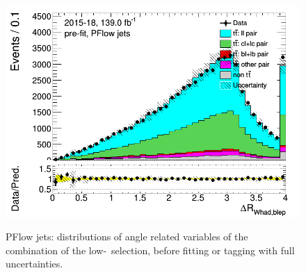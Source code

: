 \documentclass[letterpaper,12pt]{article}
\begin{document}
\begin{figure}[H]
\includegraphics[width=.45\textwidth]{FTAG_plots/pretagNoRwLowpTPFlowall/DataMC_h_dRWhadblep.png} \\
\caption{PFlow jets: distributions of angle related variables of the combination of the low-\pt\ selection,
 before fitting or 
tagging with full uncertainties.} \label{fig:lowpT_angles_PFlow}
\end{figure}
\end{document}
